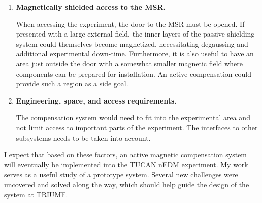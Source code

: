 \begin{enumerate}
    \item {\bf Magnetically shielded access to the MSR.} 
    
    When accessing the experiment, the door to the MSR must be opened. If presented with a large external field, the inner layers of the passive shielding system could themselves become magnetized, necessitating degaussing and additional experimental down-time.  Furthermore, it is also useful to have an area just outside the door with a somewhat smaller magnetic field where components can be prepared for installation.  An active compensation could provide such a region as a side goal.

    \item {\bf Engineering, space, and access requirements.} 
    
    The compensation system would need to fit into the experimental area and not limit access to important parts of the experiment.  The interfaces to other subsystems needs to be taken into account.
\end{enumerate}

 I expect that based on these factors, an active magnetic compensation system will eventually be implemented into the TUCAN nEDM experiment. My work serves as a useful study of a prototype system. Several new challenges were uncovered and solved along the way, which should help guide the design of the system at TRIUMF.
 





